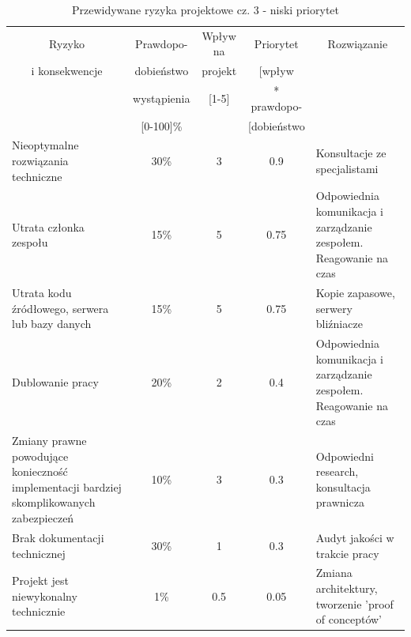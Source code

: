 \documentclass[a4paper,11pt]{article}
\begin{document}
\begin{table}[H]
	\centering
	\caption{Przewidywane ryzyka projektowe cz. 3 - niski priorytet}
	\bgroup
	\begin{tabular}{|p{5cm}|c|c|c|p{5cm}|}
		\hline
		\multicolumn{1}{|c|}{Ryzyko} & \multicolumn{1}{c|}{Prawdopo-} & \multicolumn{1}{c|}{Wpływ na} & \multicolumn{1}{c|}{Priorytet } & \multicolumn{1}{c|}{Rozwiązanie} \\
		\multicolumn{1}{|c|}{i konsekwencje} & \multicolumn{1}{c|}{dobieństwo} & \multicolumn{1}{c|}{projekt} & \multicolumn{1}{c|}{[wpływ} &  \\
		\multicolumn{1}{|c|}{} & \multicolumn{1}{c|}{wystąpienia} & \multicolumn{1}{c|}{[1-5]} & \multicolumn{1}{c|}{* prawdopo-} & \multicolumn{1}{c|}{} \\
		\multicolumn{1}{|c|}{} & \multicolumn{1}{c|}{[0-100]\%} & \multicolumn{1}{c|}{} & \multicolumn{1}{c|}{[dobieństwo} &  \\ \hline \hline
		
		
		Nieoptymalne rozwiązania techniczne & 30\% & 3 & 0.9 & Konsultacje ze specjalistami
		\\ \hline
		Utrata członka zespołu & 15\% & 5 & 0.75 & Odpowiednia komunikacja i zarządzanie zespołem. Reagowanie na czas
		\\ \hline
		Utrata kodu źródłowego, serwera lub bazy danych & 15\% & 5 & 0.75 & Kopie zapasowe, serwery bliźniacze
		\\ \hline
		Dublowanie pracy & 20\% & 2 & 0.4 & Odpowiednia komunikacja i zarządzanie zespołem. Reagowanie na czas
		\\ \hline
		Zmiany prawne powodujące konieczność implementacji bardziej skomplikowanych zabezpieczeń & 10\% & 3 & 0.3 & Odpowiedni research, konsultacja prawnicza
		\\ \hline
		Brak dokumentacji technicznej & 30\% & 1 & 0.3 & Audyt jakości w trakcie pracy
		\\ \hline
		Projekt jest niewykonalny technicznie & 1\% & 0.5 & 0.05 & Zmiana architektury, tworzenie 'proof of conceptów'
		\\ \hline
		
		
		
		
		
	\end{tabular}
	\egroup
\end{table}

\newpage
\end{document}
